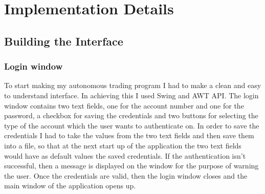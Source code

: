 \documentclass[12pt,a4paper]{report}
\begin{document}
\chapter{Implementation Details}

\section{Building the Interface}
\subsection{Login window}
To start making my autonomous trading program I had to make a clean and easy to understand interface. In achieving this I used Swing and AWT API. The login window contains two text fields, one for the account number and one for the password, a checkbox for saving the credentials and two buttons for selecting the type of the account which the user wants to authenticate on. In order to save the credentials I had to take the values from the two text fields and then save them into a file, so that at the next start up of the application the two text fields would have as default values the saved credentials. If the authentication isn't successful, then a message is displayed on the window for the purpose of warning the user. Once the credentials are valid, then the login window closes and the main window of the application opens up.
\end{document}
